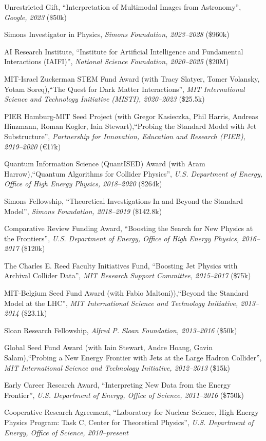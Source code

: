 \bbl
\item Unrestricted Gift, ``Interpretation of Multimodal Images from Astronomy'', \textit{Google, 2023}
(\$50k)
\item Simons Investigator in Physics, \textit{Simons Foundation, 2023--2028}
(\$960k)
\item AI Research Institute, ``Institute for Artificial Intelligence and Fundamental Interactions (IAIFI)'', \textit{National Science Foundation, 2020--2025}
(\$20M)
\item MIT-Israel Zuckerman STEM Fund Award (with Tracy Slatyer, Tomer Volansky, Yotam Soreq),``The Quest for Dark Matter Interactions'', \textit{MIT International Science and Technology Initiative (MISTI), 2020--2023}
(\$25.5k)
\item PIER Hamburg-MIT Seed Project (with Gregor Kasieczka, Phil Harris, Andreas Hinzmann, Roman Kogler, Iain Stewart),``Probing the Standard Model with Jet Substructure'', \textit{Partnership for Innovation, Education and Research (PIER), 2019--2020}
(\euro17k)
\item Quantum Information Science (QuantISED) Award (with Aram Harrow),``Quantum Algorithms for Collider Physics'', \textit{U.S. Department of Energy, Office of High Energy Physics, 2018--2020}
(\$264k)
\item Simons Fellowship, ``Theoretical Investigations In and Beyond the Standard Model'', \textit{Simons Foundation, 2018--2019}
(\$142.8k)
\item Comparative Review Funding Award, ``Boosting the Search for New Physics at the Frontiers'', \textit{U.S. Department of Energy, Office of High Energy Physics, 2016--2017}
(\$120k)
\item The Charles E. Reed Faculty Initiatives Fund, ``Boosting Jet Physics with Archival Collider Data'', \textit{MIT Research Support Committee, 2015--2017}
(\$75k)
\item MIT-Belgium Seed Fund Award (with Fabio Maltoni)),``Beyond the Standard Model at the LHC'', \textit{MIT International Science and Technology Initiative, 2013--2014}
(\$23.1k)
\item Sloan Research Fellowship, \textit{Alfred P. Sloan Foundation, 2013--2016}
(\$50k)
\item Global Seed Fund Award (with Iain Stewart, Andre Hoang, Gavin Salam),``Probing a New Energy Frontier with Jets at the Large Hadron Collider'', \textit{MIT International Science and Technology Initiative, 2012--2013}
(\$15k)
\item Early Career Research Award, ``Interpreting New Data from the Energy Frontier'', \textit{U.S. Department of Energy, Office of Science, 2011--2016}
(\$750k)
\item Cooperative Research Agreement, ``Laboratory for Nuclear Science, High Energy Physics Program: Task C, Center for Theoretical Physics'', \textit{U.S. Department of Energy, Office of Science, 2010--present}

\el
